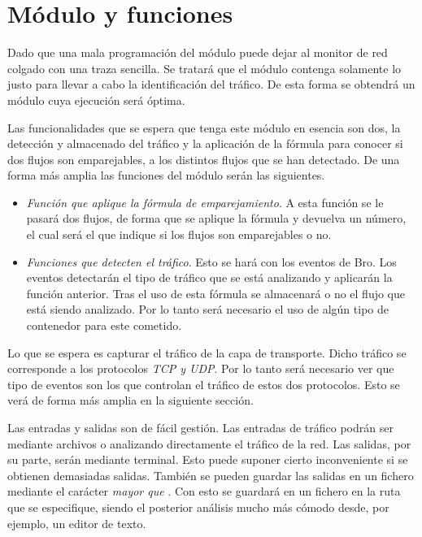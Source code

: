 \section{Módulo y funciones}

Dado que una mala programación del módulo puede dejar al monitor de red colgado con una traza sencilla. Se tratará 
que el módulo contenga solamente lo justo para llevar a cabo la identificación del tráfico. De esta forma se 
obtendrá un módulo cuya ejecución será óptima. 

\intro Las funcionalidades que se espera que tenga este módulo en esencia son dos, la detección y almacenado 
del tráfico y la aplicación de la fórmula para conocer si dos flujos son emparejables, a los distintos flujos que 
se han detectado. De una forma más amplia las funciones del módulo serán las siguientes. 

\begin{itemize}
\item \textit{Función que aplique la fórmula de emparejamiento}. 
\intro A esta función se le pasará dos flujos, de forma que se aplique la fórmula y devuelva un número, el cual 
será el que indique si los flujos son emparejables o no.
\item \textit{Funciones que detecten el tráfico}. 
\intro Esto se hará con los eventos de Bro. Los eventos detectarán el tipo de tráfico que se está analizando 
y aplicarán la función anterior.
\intro Tras el uso de esta fórmula se almacenará o no el flujo que está siendo analizado. Por lo tanto 
será necesario el uso de algún tipo de contenedor para este cometido.
\end{itemize}

\intro Lo que se espera es capturar el tráfico de la capa de transporte. Dicho tráfico se corresponde a los 
protocolos \textit{TCP y UDP}. Por lo tanto será necesario ver que tipo de eventos son los que controlan el tráfico 
de estos dos protocolos. Esto se verá de forma más amplia en la siguiente sección.

\intro Las entradas y salidas son de fácil gestión. Las entradas de tráfico podrán ser mediante archivos o 
analizando directamente el tráfico de la red. Las salidas, por su parte, serán mediante terminal. Esto puede 
suponer cierto inconveniente si se obtienen demasiadas salidas. También se pueden guardar las salidas en un 
fichero mediante el carácter \textit{mayor que} . Con esto se guardará en un fichero en la ruta que se especifique, siendo el 
posterior análisis mucho más cómodo desde, por ejemplo, un editor de texto.

